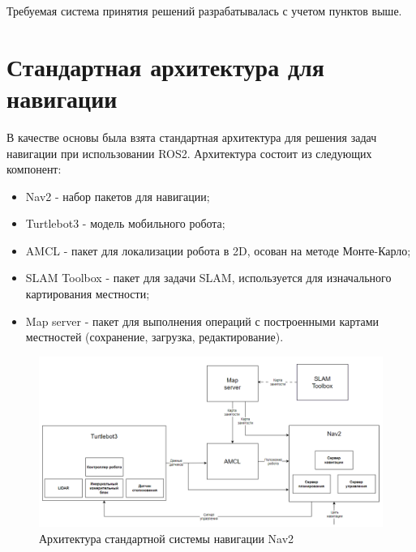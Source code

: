 Требуемая система принятия решений разрабатывалась с учетом пунктов выше.

\section{Стандартная архитектура для навигации}
В качестве основы была взята стандартная архитектура для решения задач навигации при использовании ROS2. Архитектура состоит из следующих компонент:
\begin{itemize}
    \item Nav2 - набор пакетов для навигации;
    \item Turtlebot3 - модель мобильного робота;
    \item AMCL - пакет для локализации робота в 2D, осован на методе Монте-Карло;
    \item SLAM Toolbox - пакет для задачи SLAM, используется для изначального картирования местности;
    \item Map server - пакет для выполнения операций с построенными картами местностей (сохранение, загрузка, редактирование).
\end{itemize}

\begin{figure}[h]
    \centering
    \includegraphics[width=1.0\textwidth]{images/chap_3/sys_arch_nav2.png}
    \caption{Архитектура стандартной системы навигации Nav2}
    \label{fig:sys_arch_nav2}
\end{figure}

